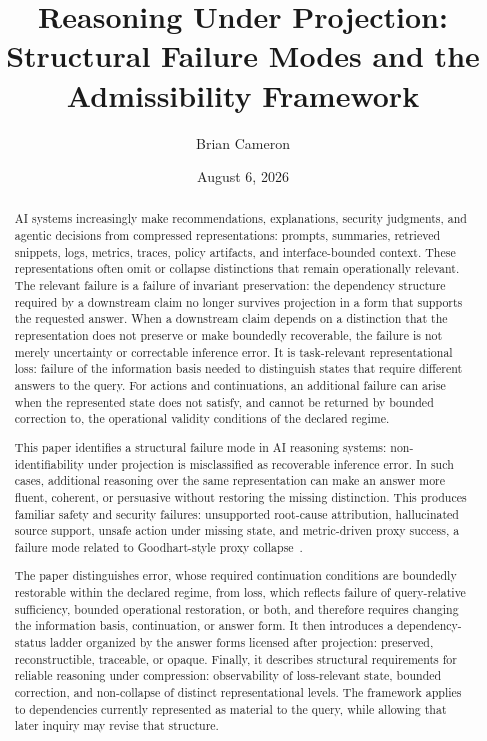 \documentclass[11pt]{article}
\title{Reasoning Under Projection:\\
Structural Failure Modes and the Admissibility Framework}
\author{Brian Cameron}
\date{August 6, 2026}
\begin{document}
\maketitle

\begin{abstract}
AI systems increasingly make recommendations, explanations, security judgments, and agentic decisions from compressed representations: prompts, summaries, retrieved snippets, logs, metrics, traces, policy artifacts, and interface-bounded context. These representations often omit or collapse distinctions that remain operationally relevant. The relevant failure is a failure of invariant preservation: the dependency structure required by a downstream claim no longer survives projection in a form that supports the requested answer. When a downstream claim depends on a distinction that the representation does not preserve or make boundedly recoverable, the failure is not merely uncertainty or correctable inference error. It is task-relevant representational loss: failure of the information basis needed to distinguish states that require different answers to the query. For actions and continuations, an additional failure can arise when the represented state does not satisfy, and cannot be returned by bounded correction to, the operational validity conditions of the declared regime.

This paper identifies a structural failure mode in AI reasoning systems: non-identifiability under projection is misclassified as recoverable inference error. In such cases, additional reasoning over the same representation can make an answer more fluent, coherent, or persuasive without restoring the missing distinction. This produces familiar safety and security failures: unsupported root-cause attribution, hallucinated source support, unsafe action under missing state, and metric-driven proxy success, a failure mode related to Goodhart-style proxy collapse~\cite{Goodhart1975}.

The paper distinguishes error, whose required continuation conditions are boundedly restorable within the declared regime, from loss, which reflects failure of query-relative sufficiency, bounded operational restoration, or both, and therefore requires changing the information basis, continuation, or answer form. It then introduces a dependency-status ladder organized by the answer forms licensed after projection: preserved, reconstructible, traceable, or opaque. Finally, it describes structural requirements for reliable reasoning under compression: observability of loss-relevant state, bounded correction, and non-collapse of distinct representational levels. The framework applies to dependencies currently represented as material to the query, while allowing that later inquiry may revise that structure.


\end{abstract}
\end{document}
